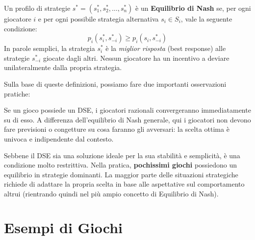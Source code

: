 \begin{definizione}
    Un profilo di strategie $s^* = (s_1^*, s_2^*, \dots, s_n^*)$ è un \textbf{Equilibrio di Nash} se, per ogni giocatore $i$ e per ogni possibile strategia alternativa $s_i \in S_i$, vale la seguente condizione:
    \[
    p_i(s_i^*, s_{-i}^*) \geq p_i(s_i, s_{-i}^*)
    \]
    In parole semplici, la strategia $s_i^*$ è la \textit{miglior risposta} (best response) alle strategie $s_{-i}^*$ giocate dagli altri. Nessun giocatore ha un incentivo a deviare unilateralmente dalla propria strategia.
\end{definizione}

Sulla base di queste definizioni, possiamo fare due importanti osservazioni pratiche:

\begin{osservazione}
Se un gioco possiede un DSE, i giocatori razionali convergeranno immediatamente su di esso.
A differenza dell'equilibrio di Nash generale, qui i giocatori non devono fare previsioni o congetture su cosa faranno gli avversari: la scelta ottima è univoca e indipendente dal contesto.
\end{osservazione}

\begin{osservazione}
Sebbene il DSE sia una soluzione ideale per la sua stabilità e semplicità, è una condizione molto restrittiva. Nella pratica, \textbf{pochissimi giochi} possiedono un equilibrio in strategie dominanti. La maggior parte delle situazioni strategiche richiede di adattare la propria scelta in base alle aspettative sul comportamento altrui (rientrando quindi nel più ampio concetto di Equilibrio di Nash).
\end{osservazione}

\section{Esempi di Giochi}

